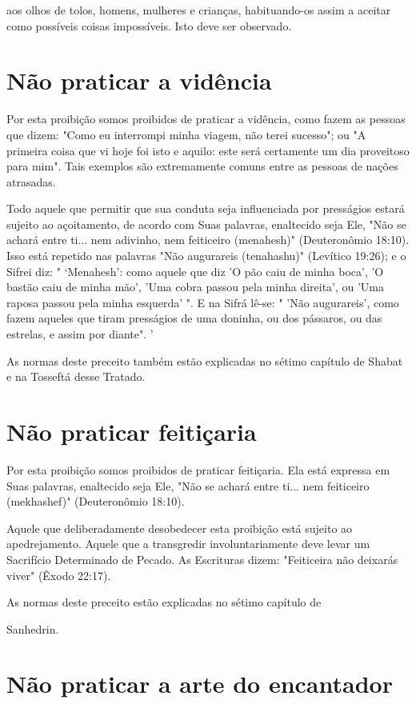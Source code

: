 aos olhos de tolos, homens, mulheres e crianças, habituando-os assim a
aceitar como possíveis coisas impossíveis. Isto deve ser observado.

\section{Não praticar a vidência}

Por esta proibição somos proibidos de praticar a vidência, como fa­zem
as pessoas que dizem: "Como eu interrompi minha viagem, não terei
su­cesso"; ou "A primeira coisa que vi hoje foi isto e aquilo: este será
certamente um dia proveitoso para mim". Tais exemplos são extremamente
comuns entre as pessoas de nações atrasadas.

Todo aquele que permitir que sua conduta seja influenciada por
pres­ságios estará sujeito ao açoitamento, de acordo com Suas palavras,
enaltecido seja Ele, "Não se achará entre ti... nem adivinho, nem
feiticeiro (menahesh)" (Deuteronômio 18:10). Isso está repetido nas
palavras "Não augurareis (tena­hashu)" (Levítico 19:26); e o Sifrei diz:
" `Menahesh': como aquele que diz 'O pão caiu de minha boca', 'O bastão
caiu de minha mão', 'Uma cobra passou pela minha direita', ou 'Uma
raposa passou pela minha esquerda' ". E na Sifrá lê-se: " 'Não
augurareis', como fazem aqueles que tiram presságios de uma do­ninha, ou
dos pássaros, ou das estrelas, e assim por diante". '

As normas deste preceito também estão explicadas no sétimo capí­tulo de
Shabat e na Tosseftá desse Tratado.

\section{Não praticar feitiçaria}

Por esta proibição somos proibidos de praticar feitiçaria. Ela está
ex­pressa em Suas palavras, enaltecido seja Ele, "Não se achará entre
ti... nem feiti­ceiro (mekhashef)" (Deuteronômio 18:10).

Aquele que deliberadamente desobedecer esta proibição está sujei­to ao
apedrejamento. Aquele que a transgredir involuntariamente deve levar um
Sacrifício Determinado de Pecado. As Escrituras dizem: "Feiticeira não
dei­xarás viver" (Êxodo 22:17).


As normas deste preceito estão explicadas no sétimo capítulo de


Sanhedrin.

\section{Não praticar a arte do encantador}

